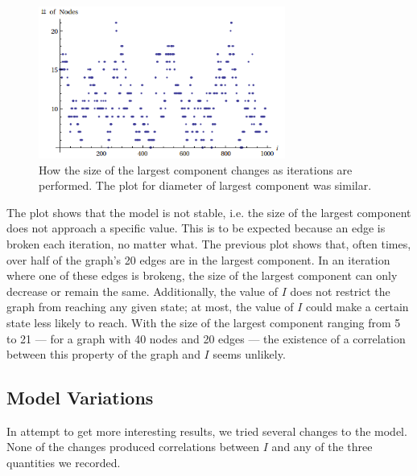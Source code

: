 \documentclass[a4paper,10pt]{article}
\begin{document}


\begin{figure}[H]
\label{fig:gc-size-iter}
\begin{center}
\includegraphics[height=5cm]{images/gc_size_iter.png}
\caption{How the size of the largest component changes as iterations are performed. The plot for diameter of largest component was similar.}
\end{center}
\end{figure} 
The plot shows that the model is not stable, i.e. the size of the largest component does not approach a specific value. This is to be expected because an edge is broken each iteration, no matter what. The previous plot shows that, often times, over half of the graph's 20 edges are in the largest component. In an iteration where one of these edges is brokeng, the size of the largest component can only decrease or remain the same. Additionally, the value of $I$ does not restrict the graph from reaching any given state; at most, the value of $I$ could make a certain state less likely to reach. With the size of the largest component ranging from 5 to 21 --- for a graph with 40 nodes and 20 edges --- the existence of a correlation between this property of the graph and $I$ seems unlikely.

\subsection{Model Variations}
In attempt to get more interesting results, we tried several changes to the model. None of the changes produced correlations between $I$ and any of the three quantities we recorded.
\end{document}
